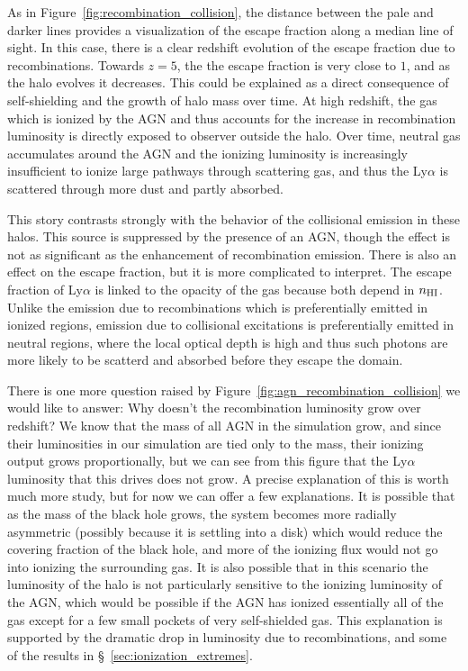 As in Figure~\ref{fig:recombination_collision}, the distance between the pale and darker lines provides a visualization of the escape fraction along a median line of sight.
In this case, there is a clear redshift evolution of the escape fraction due to recombinations.
Towards $z=5$, the the escape fraction is very close to $1$, and as the halo evolves it decreases.
This could be explained as a direct consequence of self-shielding and the growth of halo mass over time.
At high redshift, the gas which is ionized by the AGN and thus accounts for the increase in recombination luminosity is directly exposed to observer outside the halo.
Over time, neutral gas accumulates around the AGN and the ionizing luminosity is increasingly insufficient to ionize large pathways through scattering gas, and thus the Ly$\alpha$ is scattered through more dust and partly absorbed.

This story contrasts strongly with the behavior of the collisional emission in these halos.
This source is suppressed by the presence of an AGN, though the effect is not as significant as the enhancement of recombination emission.
There is also an effect on the escape fraction, but it is more complicated to interpret.
The escape fraction of Ly$\alpha$ is linked to the opacity of the gas because both depend in $n_{\rm{HI}}$.
Unlike the emission due to recombinations which is preferentially emitted in ionized regions, emission due to collisional excitations is preferentially emitted in neutral regions, where the local optical depth is high and thus such photons are more likely to be scatterd and absorbed before they escape the domain.

There is one more question raised by Figure~\ref{fig:agn_recombination_collision} we would like to answer: Why doesn't the recombination luminosity grow over redshift?
We know that the mass of all AGN in the simulation grow, and since their luminosities in our simulation are tied only to the mass, their ionizing output grows proportionally, but we can see from this figure that the Ly$\alpha$ luminosity that this drives does not grow.
A precise explanation of this is worth much more study, but for now we can offer a few explanations.
It is possible that as the mass of the black hole grows, the system becomes more radially asymmetric (possibly because it is settling into a disk) which would reduce the covering fraction of the black hole, and more of the ionizing flux would not go into ionizing the surrounding gas.
It is also possible that in this scenario the luminosity of the halo is not particularly sensitive to the ionizing luminosity of the AGN, which would be possible if the AGN has ionized essentially all of the gas except for a few small pockets of very self-shielded gas.
This explanation is supported by the dramatic drop in luminosity due to recombinations, and some of the results in \S~\ref{sec:ionization_extremes}.

